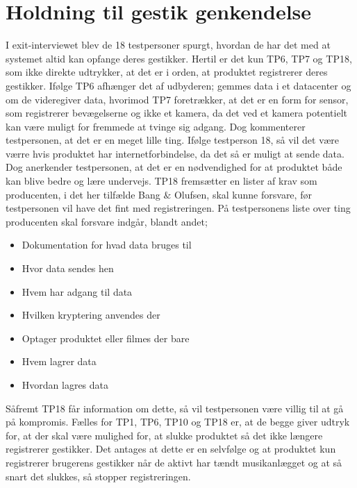 \section{Holdning til gestik genkendelse}
\label{TestresultaterOvervaagning}
%
I exit-interviewet blev de 18 testpersoner spurgt, hvordan de har det med at systemet altid kan opfange deres gestikker. Hertil er det kun TP6, TP7 og TP18, som ikke direkte udtrykker, at det er i orden, at produktet registrerer deres gestikker. Ifølge TP6 afhænger det af udbyderen; gemmes data i et datacenter og om de videregiver data, hvorimod TP7 foretrækker, at det er en form for sensor, som registrerer bevægelserne og ikke et kamera, da det ved et kamera potentielt kan være muligt for fremmede at tvinge sig adgang. Dog kommenterer testpersonen, at det er en meget lille ting. Ifølge testperson 18, så vil det være værre hvis produktet har internetforbindelse, da det så er muligt at sende data. Dog anerkender testpersonen, at det er en nødvendighed for at produktet både kan blive bedre og lære undervejs. TP18 fremsætter en lister af krav som producenten, i det her tilfælde Bang $\&$ Olufsen, skal kunne forsvare, før testpersonen vil have det fint med registreringen. På testpersonens liste over ting producenten skal forsvare indgår, blandt andet; 
%
\begin{itemize}
  \item Dokumentation for hvad data bruges til
  \item Hvor data sendes hen
  \item Hvem har adgang til data
  \item Hvilken kryptering anvendes der
  \item Optager produktet eller filmes der bare
  \item Hvem lagrer data
  \item Hvordan lagres data
\end{itemize}
%
Såfremt TP18 får information om dette, så vil testpersonen være villig til at gå på kompromis. Fælles for TP1, TP6, TP10 og TP18 er, at de begge giver udtryk for, at der skal være mulighed for, at slukke produktet så det ikke længere registrerer gestikker. Det antages at dette er en selvfølge og at produktet kun registrerer brugerens gestikker når de aktivt har tændt musikanlægget og at så snart det slukkes, så stopper registreringen. 

